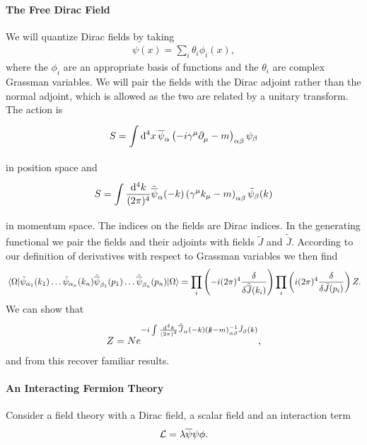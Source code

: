 \paragraph{The Free Dirac Field}
We will quantize Dirac fields by taking
\begin{align*}
	\psi(x) = \sum\limits_{i}\theta_{i}\phi_{i}(x),
\end{align*}
where the $\phi_{i}$ are an appropriate basis of functions and the $\theta_{i}$ are complex Grassman variables. We will pair the fields with the Dirac adjoint rather than the normal adjoint, which is allowed as the two are related by a unitary transform. The action is
\begin{align*}
	S = \int\limits_{}^{}\dd[4]{x}\overline{\psi}_{\alpha}\left(-i\gamma^{\mu}\partial^{}_{\mu} - m\right)_{\alpha\beta}\psi_{\beta}
\end{align*}
in position space and
\begin{align*}
	S = \int\limits_{}^{}\frac{\dd[4]{k}}{(2\pi)^{4}}\tilde{\overline{\psi}}_{\alpha}(-k)\left(\gamma^{\mu}k_{\mu} - m\right)_{\alpha\beta}\tilde{\psi}_{\beta}(k)
\end{align*}
in momentum space. The indices on the fields are Dirac indices. In the generating functional we pair the fields and their adjoints with fields $\tilde{J}$ and $\tilde{\overline{J}}$. According to our definition of derivatives with respect to Grassman variables we then find
\begin{align*}
	\expval{\tilde{\psi}_{\alpha_{1}}(k_{1})\dots\tilde{\psi}_{\alpha_{n}}(k_{n})\tilde{\overline{\psi}}_{\beta_{1}}(p_{1})\dots\tilde{\overline{\psi}}_{\beta_{n}}(p_{n})}{\Omega} = \prod\limits_{i}\left(-i(2\pi)^{4}\fdv{\tilde{\overline{J}}(k_{i})}\right)\prod\limits_{i}\left(i(2\pi)^{4}\fdv{\tilde{J}(p_{i})}\right)Z.
\end{align*}
We can show that
\begin{align*}
	Z = Ne^{-i\int\limits_{}^{}\frac{\dd[4]{k}}{(2\pi)^{4}}\tilde{\overline{J}}_{\alpha}(-k)(\slashed{k} - m)_{\alpha\beta}^{-1}\tilde{J}_{\beta}(k)},
\end{align*}
and from this recover familiar results.

\paragraph{An Interacting Fermion Theory}
Consider a field theory with a Dirac field, a scalar field and an interaction term
\begin{align*}
	\mathcal{L} = \lambda\overline{\psi}\psi\phi.
\end{align*}

